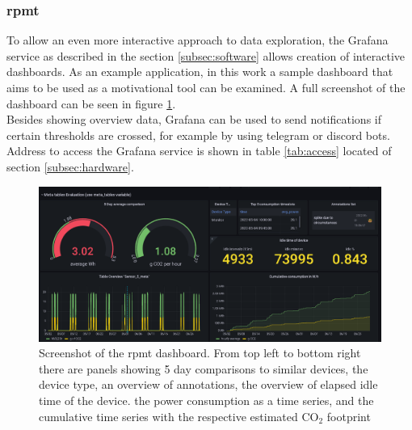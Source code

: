 \subsubsection{\acrfull{rpmt}}\label{subsec:RPMT}
To allow an even more interactive approach to data exploration, the Grafana service as described in the section \ref{subsec:software} allows creation of interactive dashboards. As an example application, in this work a sample dashboard that aims to be used as a motivational tool can be examined. A full screenshot of the dashboard can be seen in figure \ref{fig:dashboard}.\\
Besides showing overview data, Grafana can be used to send notifications if certain thresholds are crossed, for example by using telegram or discord bots. Address to access the Grafana service is shown in table \ref{tab:access} located of section \ref{subsec:hardware}.
\begin{figure}[h]
	\centering	
	\includegraphics[width=\textwidth]{images/RPMT.png}
	\caption{Screenshot of the \acrshort{rpmt} dashboard. From top left to bottom right there are panels showing 5 day comparisons to similar devices, the device type, an overview of annotations, the overview of elapsed idle time of the device. the power consumption as a time series, and the cumulative time series with the respective estimated CO$_2$ footprint}
	\label{fig:dashboard}
\end{figure}